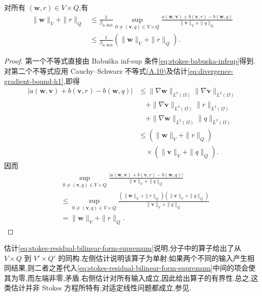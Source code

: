 \begin{lemma}[双线性型上确界的估计]\label{lem:stokes-residual-bilinear-form-supremum}
对所有 $(\bm{w},r)\in V\times Q$,有
\begin{equation}\label{eq:stokes-residual-bilinear-form-supremum}
\begin{aligned}
  \|\bm{w}\|_V+\|r\|_Q
  &\leq\frac1{\beta_{\mathrm{is,Bab}}}
  \sup_{0\ne(\bm{v},q)\in V\times Q}
  \frac{a(\bm{w},\bm{v})+b(\bm{v},r)-b(\bm{w},q)}
       {\|\bm{v}\|_V+\|q\|_Q}\\
  &\leq\frac1{\beta_{\mathrm{is,Bab}}}
       \left(\|\bm{w}\|_V+\|r\|_Q\right).
\end{aligned}
\end{equation}
\end{lemma}
\begin{proof}
第一个不等式直接由 Babuška inf-sup 条件\cref{eq:stokes-babuska-infsup}得到.对第二个不等式应用 Cauchy--Schwarz 不等式\hyperref[eq:appendix-a-10]{(A.10)}及估计\cref{eq:divergence-gradient-bound-h1},即得
\[
\begin{aligned}
 \left|a(\bm{w},\bm{v})+b(\bm{v},r)-b(\bm{w},q)\right|
 &\leq\|\nabla\bm{w}\|_{L^2(\Omega)}
       \|\nabla\bm{v}\|_{L^2(\Omega)}\\
 &\quad+\|\nabla\bm{v}\|_{L^2(\Omega)}\|r\|_{L^2(\Omega)}\\
 &\quad+\|\nabla\bm{w}\|_{L^2(\Omega)}\|q\|_{L^2(\Omega)}\\
 &\leq\left(\|\bm{w}\|_V+\|r\|_Q\right)\\
 &\quad\times\left(\|\bm{v}\|_V+\|q\|_Q\right).
\end{aligned}
\]
因而
\[
\begin{aligned}
 &\sup_{0\ne(\bm{v},q)\in V\times Q}
  \frac{|a(\bm{w},\bm{v})+b(\bm{v},r)-b(\bm{w},q)|}
       {\|\bm{v}\|_V+\|q\|_Q}\\
 &\leq\sup_{0\ne(\bm{v},q)\in V\times Q}
  \frac{\left(\|\bm{w}\|_V+\|r\|_Q\right)
        \left(\|\bm{v}\|_V+\|q\|_Q\right)}
       {\|\bm{v}\|_V+\|q\|_Q}\\
 &=\|\bm{w}\|_V+\|r\|_Q.
\end{aligned}
\]
\end{proof}

\begin{note}\label{note:stokes-residual-bilinear-form-supremum}
估计\cref{eq:stokes-residual-bilinear-form-supremum}说明,分子中的算子给出了从 $V\times Q$ 到 $V'\times Q'$ 的同构.左侧估计说明该算子为单射:如果两个不同的输入产生相同结果,则二者之差代入\cref{eq:stokes-residual-bilinear-form-supremum}中间的项会使其为零,而左端非零,矛盾.右侧估计对所有输入成立,因此给出算子的有界性.总之,这类估计并非 Stokes 方程所特有;对适定线性问题都成立,参见\textcite[命题 4.1]{Verfuerth2013}.
\end{note}

